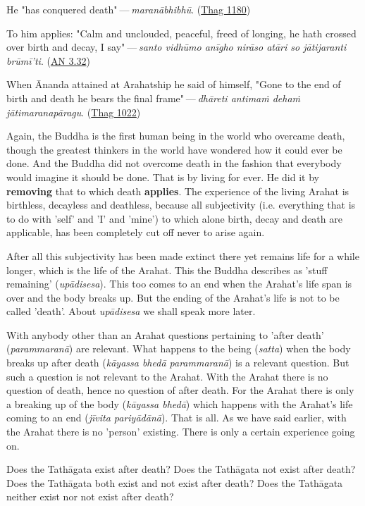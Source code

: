 He "has conquered death" --- \emph{maranābhibhū}. (\href{https://suttacentral.net/thag20.1/en/sujato}{Thag 1180})

To him applies: "Calm and unclouded, peaceful, freed of longing, he hath crossed over birth and decay, I say" --- \emph{santo vidhūmo anīgho nirāso atāri so jātijaranti brūmī'ti}. (\href{https://suttacentral.net/an3.32/en/bodhi}{AN 3.32})

When Ānanda attained at Arahatship he said of himself, "Gone to the end of birth and death he bears the final frame" --- \emph{dhāreti antimaṁ dehaṁ jātimaranapāragu}. (\href{https://suttacentral.net/thag17.3/en/sujato}{Thag 1022})

Again, the Buddha is the first human being in the world who overcame death, though the greatest thinkers in the world have wondered how it could ever be done. And the Buddha did not overcome death in the fashion that everybody would imagine it should be done. That is by living for ever. He did it by \textbf{removing} that to which death \textbf{applies}. The experience of the living Arahat is birthless, decayless and deathless, because all subjectivity (i.e. everything that is to do with 'self' and 'I' and 'mine') to which alone birth, decay and death are applicable, has been completely cut off never to arise again.

After all this subjectivity has been made extinct there yet remains life for a while longer, which is the life of the Arahat. This the Buddha describes as 'stuff remaining' (\emph{upādisesa}). This too comes to an end when the Arahat's life span is over and the body breaks up. But the ending of the Arahat's life is not to be called 'death'. About \emph{upādisesa} we shall speak more later.

With anybody other than an Arahat questions pertaining to 'after death' (\emph{parammaranā}) are relevant. What happens to the being (\emph{satta}) when the body breaks up after death (\emph{kāyassa bhedā parammaranā}) is a relevant question. But such a question is not relevant to the Arahat. With the Arahat there is no question of death, hence no question of after death. For the Arahat there is only a breaking up of the body (\emph{kāyassa bhedā}) which happens with the Arahat's life coming to an end (\emph{jīvita pariyādānā}). That is all. As we have said earlier, with the Arahat there is no 'person' existing. There is only a certain experience going on.

Does the Tathāgata exist after death? Does the Tathāgata not exist after death? Does the Tathāgata both exist and not exist after death? Does the Tathāgata neither exist nor not exist after death?

